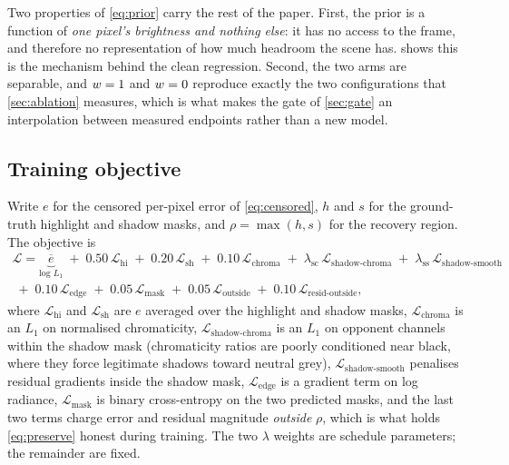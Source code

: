Two properties of \cref{eq:prior} carry the rest of the paper. First, the prior
is a function of \emph{one pixel's brightness and nothing else}: it has no access
to the frame, and therefore no representation of how much headroom the scene
has.  shows this is the mechanism behind the clean regression.
Second, the two arms are separable, and $w = 1$ and $w = 0$ reproduce
exactly the two configurations that \cref{sec:ablation} measures, which is what
makes the gate of \cref{sec:gate} an interpolation between measured endpoints
rather than a new model.

\subsection{Training objective}
\label{sec:objective}

Write $e$ for the censored per-pixel error of \cref{eq:censored}, $h$ and $s$
for the ground-truth highlight and shadow masks, and
$\rho = \max(h, s)$ for the recovery region. The objective is
\begin{multline}
\mathcal{L} = \underbrace{\overline{e}}_{\text{log } L_1}
\;+\; 0.50\,\mathcal{L}_{\mathrm{hi}}
\;+\; 0.20\,\mathcal{L}_{\mathrm{sh}}
\;+\; 0.10\,\mathcal{L}_{\mathrm{chroma}}
\;+\; \lambda_{\mathrm{sc}}\,\mathcal{L}_{\mathrm{shadow\text{-}chroma}}
\;+\; \lambda_{\mathrm{ss}}\,\mathcal{L}_{\mathrm{shadow\text{-}smooth}}\\
\;+\; 0.10\,\mathcal{L}_{\mathrm{edge}}
\;+\; 0.05\,\mathcal{L}_{\mathrm{mask}}
\;+\; 0.05\,\mathcal{L}_{\mathrm{outside}}
\;+\; 0.10\,\mathcal{L}_{\mathrm{resid\text{-}outside}},
\label{eq:loss}
\end{multline}
where $\mathcal{L}_{\mathrm{hi}}$ and $\mathcal{L}_{\mathrm{sh}}$ are $e$
averaged over the highlight and shadow masks, $\mathcal{L}_{\mathrm{chroma}}$ is
an $L_1$ on normalised chromaticity, $\mathcal{L}_{\mathrm{shadow\text{-}chroma}}$
is an $L_1$ on opponent channels within the shadow mask (chromaticity ratios are
poorly conditioned near black, where they force legitimate shadows toward
neutral grey), $\mathcal{L}_{\mathrm{shadow\text{-}smooth}}$ penalises residual
gradients inside the shadow mask, $\mathcal{L}_{\mathrm{edge}}$ is a gradient
term on log radiance, $\mathcal{L}_{\mathrm{mask}}$ is binary cross-entropy on
the two predicted masks, and the last two terms charge error and residual
magnitude \emph{outside} $\rho$, which is what holds \cref{eq:preserve} honest
during training. The two $\lambda$ weights are schedule parameters; the
remainder are fixed.
